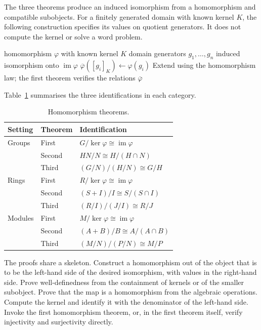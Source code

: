 \documentclass[11pt,letterpaper]{article}
\begin{document}
The three theorems produce an induced isomorphism from a homomorphism and compatible subobjects. For a finitely generated domain with known kernel \(K\), the following construction specifies its values on quotient generators. It does not compute the kernel or solve a word problem.

\begin{algorithm}
\caption{InducedIsomorphism}
\begin{algorithmic}[1]
\Require homomorphism \(\varphi\) with known kernel \(K\)
\Require domain generators \(g_1,\ldots,g_n\)
\Ensure induced isomorphism onto \(\operatorname{im}\varphi\)
	\State \(\overline{\varphi}([g_i]_K) \gets \varphi(g_i)\)
\EndFor
\State Extend using the homomorphism law; the first theorem verifies the relations
\State \Return \(\overline{\varphi}\)
\end{algorithmic}
\end{algorithm}

Table~\ref{tab:iso} summarises the three identifications in each category.

\begin{table}[htbp]
\centering
\caption{Homomorphism theorems.}
\label{tab:iso}
\begin{tabular}{lll}
\toprule
Setting & Theorem & Identification \\
\midrule
Groups & First & \(G/\ker\varphi\cong\operatorname{im}\varphi\) \\
       & Second & \(HN/N\cong H/(H\cap N)\) \\
       & Third & \((G/N)/(H/N)\cong G/H\) \\
\midrule
Rings & First & \(R/\ker\varphi\cong\operatorname{im}\varphi\) \\
      & Second & \((S+I)/I\cong S/(S\cap I)\) \\
      & Third & \((R/I)/(J/I)\cong R/J\) \\
\midrule
Modules & First & \(M/\ker\varphi\cong\operatorname{im}\varphi\) \\
        & Second & \((A+B)/B\cong A/(A\cap B)\) \\
        & Third & \((M/N)/(P/N)\cong M/P\) \\
\bottomrule
\end{tabular}
\end{table}

The proofs share a skeleton. Construct a homomorphism out of the object that is to be the left-hand side of the desired isomorphism, with values in the right-hand side. Prove well-definedness from the containment of kernels or of the smaller subobject. Prove that the map is a homomorphism from the algebraic operations. Compute the kernel and identify it with the denominator of the left-hand side. Invoke the first homomorphism theorem, or, in the first theorem itself, verify injectivity and surjectivity directly.
\end{document}
